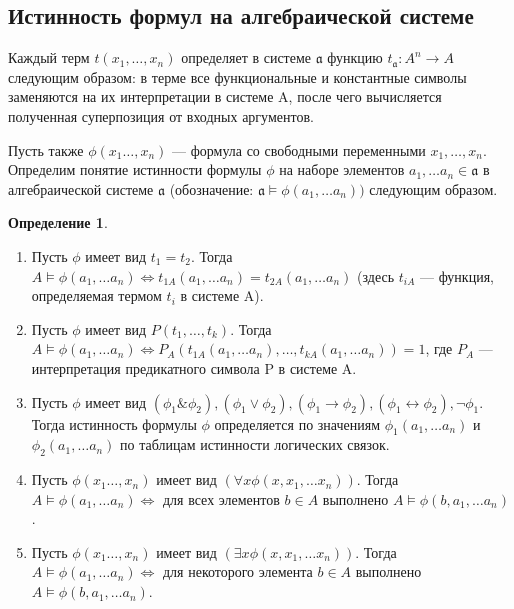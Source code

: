 \documentclass[a4paper]{article}
\theoremstyle{definition}
\newtheorem*{definition}{Определение}
\theoremstyle{remark}
\begin{document}
    \subsection{Истинность формул на алгебраической системе}
    Каждый терм $t(x_1,\dots, x_n)$ определяет в системе $\mathfrak{a}$ функцию $t_{\mathfrak{a}}: A^n \rightarrow A$
    следующим образом: в терме все функциональные и 
    константные символы заменяются на их интерпретации в системе A, после чего 
    вычисляется полученная суперпозиция от входных аргументов.
    
    Пусть также $\phi(x_1 \dots, x_n)$ — формула со свободными переменными $x_1, \dots, x_n$. Определим 
    понятие истинности формулы $\phi$ на наборе элементов $a_1, \dots a_n \in \mathfrak{a}$ в алгебраической 
    системе $\mathfrak{a}$ (обозначение: $\mathfrak{a} \models \phi(a_1, \dots a_n))$ следующим образом.
    \begin{definition}
        \begin{enumerate}
            \item Пусть $\phi$ имеет вид $t_1 = t_2$. Тогда $A \models \phi(a_1, \dots a_n) \Leftrightarrow t_{1A}(a_1, \dots a_n) = t_{2A}(a_1, \dots a_n)$ (здесь $t_{iA}$ —
            функция, определяемая термом $t_i$ в системе A).
            \item Пусть $\phi$ имеет вид $P(t_1,\dots, t_k)$. Тогда 
            $A \models \phi(a_1, \dots a_n) \Leftrightarrow P_A(t_{1A}(a_1, \dots a_n), …, t_{kA}(a_1, \dots a_n)) = 1$, 
            где $P_A$ — интерпретация предикатного символа P в системе A.
            \item Пусть $\phi$ имеет вид $(\phi_1 \& \phi_2), (\phi_1 \vee \phi_2), (\phi_1 \rightarrow \phi_2), (\phi_1 \leftrightarrow \phi_2), \neg\phi_1$. Тогда истинность формулы 
            $\phi$ определяется по значениям $\phi_1(a_1, \dots a_n)$ и $\phi_2(a_1, \dots a_n)$ по таблицам истинности логических 
            связок.
            \item Пусть $\phi(x_1 \dots, x_n)$ имеет вид $(\forall x \phi(x, x_1, \dots x_n))$. Тогда $A \models \phi(a_1, \dots a_n) \Leftrightarrow$ для всех элементов 
            $b \in A$ выполнено $A \models \phi (b, a_1, \dots a_n)$.
            \item Пусть $\phi(x_1 \dots, x_n)$ имеет вид $(\exists x \phi(x, x_1, \dots x_n))$. Тогда $A \models \phi(a_1, \dots a_n) \Leftrightarrow$ для некоторого 
            элемента $b \in A$ выполнено $A \models \phi (b, a_1, \dots a_n)$.
        \end{enumerate}
    \end{definition}
\end{document}
